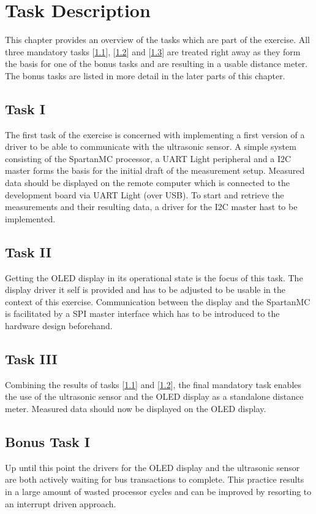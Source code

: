 \chapter{Task Description}
\label{cha:task}
	This chapter provides an overview of the tasks which are part of the exercise. All three mandatory tasks [\ref{sec:task_1}], [\ref{sec:task_2}] and [\ref{sec:task_3}] are treated right away as they form the basis for one of the bonus tasks and are resulting in a usable distance meter.
	The bonus tasks are listed in more detail in the later parts of this chapter.

	\section{Task I} %
	\label{sec:task_1}
		The first task of the exercise is concerned with implementing a first version of a driver to be able to communicate with the ultrasonic sensor. A simple system consisting of the SpartanMC processor, a UART Light peripheral and a I2C master forms the basis for the initial draft of the measurement setup.
		Measured data should be displayed on the remote computer which is connected to the development board via UART Light (over USB). To start and retrieve the measurements and their resulting data, a driver for the I2C master hast to be implemented.

	\section{Task II} %
	\label{sec:task_2}
		Getting the OLED display in its operational state is the focus of this task. The display driver it self is provided and has to be adjusted to be usable in the context of this exercise.
		Communication between the display and the SpartanMC is facilitated by a SPI master interface which has to be introduced to the hardware design beforehand.

	\section{Task III} %
	\label{sec:task_3}
		Combining the results of tasks [\ref{sec:task_1}] and [\ref{sec:task_2}], the final mandatory task enables the use of the ultrasonic sensor and the OLED display as a standalone distance meter. Measured data should now be displayed on the OLED display.

	\section{Bonus Task I} %
	\label{sec:bonus_task_1}
		Up until this point the drivers for the OLED display and the ultrasonic sensor are both actively waiting for bus transactions to complete. This practice results in a large amount of wasted processor cycles and can be improved by resorting to an interrupt driven approach. 

